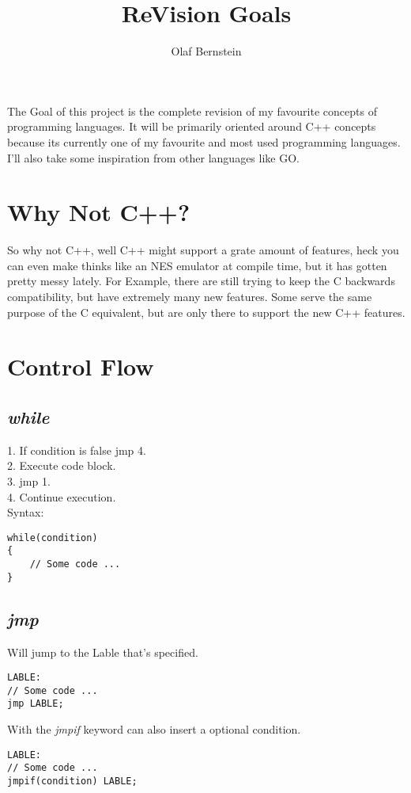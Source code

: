 \documentclass[10pt,a4paper]{article}
\author{Olaf Bernstein}
\title{ReVision Goals}
\begin{document}
\maketitle
The Goal of this project is the complete revision of my favourite concepts of programming languages. It will be primarily oriented around C++ concepts because its currently one of my favourite and most used programming languages. I'll also take some inspiration from other languages like GO.
\tableofcontents




\section{Why Not C++?}
So why not C++, well C++ might support a grate amount of features, heck you can even make thinks like an NES emulator at compile time, but it has gotten pretty messy lately. For Example, there are still trying to keep the C backwards compatibility, but have extremely many new features. Some serve the same purpose of the C equivalent, but are only there to support the new C++ features.




\section{Control Flow}


\subsection{\textit{while}}
1. If condition is false jmp 4. \\
2. Execute code block. \\
3. jmp 1. \\
4. Continue execution. \\
Syntax:
\begin{lstlisting}
while(condition)
{
	// Some code ...
}
\end{lstlisting}


\subsection{\textit{jmp}}
Will jump to the Lable that's specified.
\begin{lstlisting}
LABLE:
// Some code ...
jmp LABLE;
\end{lstlisting}
With the \textit{jmpif} keyword can also insert a optional condition.
\begin{lstlisting}
LABLE:
// Some code ...
jmpif(condition) LABLE;
\end{lstlisting}
\end{document}
